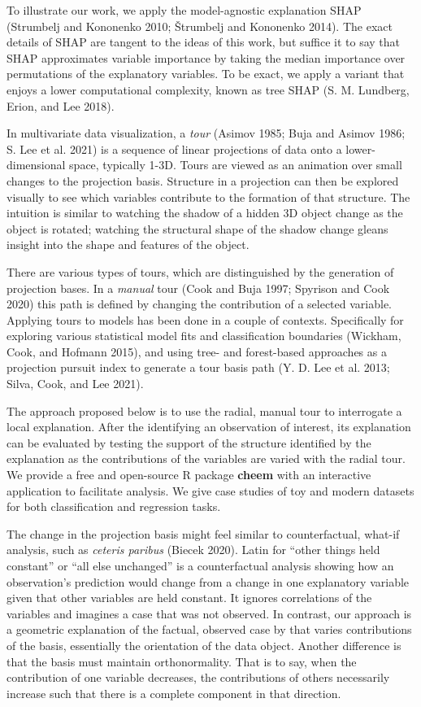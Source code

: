 \documentclass[
  article]{article}
\begin{document}
To illustrate our work, we apply the model-agnostic explanation SHAP (Strumbelj and Kononenko 2010; Štrumbelj and Kononenko 2014). The exact details of SHAP are tangent to the ideas of this work, but suffice it to say that SHAP approximates variable importance by taking the median importance over permutations of the explanatory variables. To be exact, we apply a variant that enjoys a lower computational complexity, known as tree SHAP (S. M. Lundberg, Erion, and Lee 2018).

In multivariate data visualization, a \emph{tour} (Asimov 1985; Buja and Asimov 1986; S. Lee et al. 2021) is a sequence of linear projections of data onto a lower-dimensional space, typically 1-3D. Tours are viewed as an animation over small changes to the projection basis. Structure in a projection can then be explored visually to see which variables contribute to the formation of that structure. The intuition is similar to watching the shadow of a hidden 3D object change as the object is rotated; watching the structural shape of the shadow change gleans insight into the shape and features of the object.

There are various types of tours, which are distinguished by the generation of projection bases. In a \emph{manual} tour (Cook and Buja 1997; Spyrison and Cook 2020) this path is defined by changing the contribution of a selected variable. Applying tours to models has been done in a couple of contexts. Specifically for exploring various statistical model fits and classification boundaries (Wickham, Cook, and Hofmann 2015), and using tree- and forest-based approaches as a projection pursuit index to generate a tour basis path (Y. D. Lee et al. 2013; Silva, Cook, and Lee 2021).

The approach proposed below is to use the radial, manual tour to interrogate a local explanation. After the identifying an observation of interest, its explanation can be evaluated by testing the support of the structure identified by the explanation as the contributions of the variables are varied with the radial tour. We provide a free and open-source R package \textbf{cheem} with an interactive application to facilitate analysis. We give case studies of toy and modern datasets for both classification and regression tasks.

The change in the projection basis might feel similar to counterfactual, what-if analysis, such as \emph{ceteris paribus} (Biecek 2020). Latin for ``other things held constant'' or ``all else unchanged'' is a counterfactual analysis showing how an observation's prediction would change from a change in one explanatory variable given that other variables are held constant. It ignores correlations of the variables and imagines a case that was not observed. In contrast, our approach is a geometric explanation of the factual, observed case by that varies contributions of the basis, essentially the orientation of the data object. Another difference is that the basis must maintain orthonormality. That is to say, when the contribution of one variable decreases, the contributions of others necessarily increase such that there is a complete component in that direction.
\end{document}
